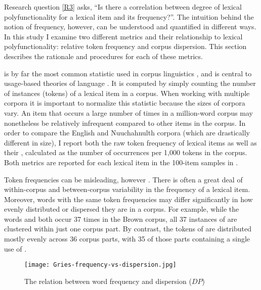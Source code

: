 Research question \ref{R3} asks, \enquote{Is there a correlation between degree of lexical polyfunctionality for a lexical item and its frequency?}. The intuition behind the notion of frequency, however, can be understood and quantified in different ways. In this study I examine two different metrics and their relationship to lexical polyfunctionality: relative token frequency and corpus dispersion. This section describes the rationale and procedures for each of these metrics.

 is by far the most common statistic used in corpus linguistics \parencite[403]{Gries2008}, and is central to usage-based theories of language \parencites{Bybee1985}{Tomasello2003}{Goldberg2006}{Bybee2007}{Bybee2010}{Diessel2019}. It is computed by simply counting the number of instances (tokens) of a lexical item in a corpus. When working with multiple corpora it is important to normalize this statistic because the sizes of corpora vary. An item that occurs a large number of times in a million-word corpus may nonetheless be relatively infrequent compared to other items in the corpus. In order to compare the English and Nuuchahnulth corpora (which are drastically different in size), I report both the raw token frequency of lexical items as well as their , calculated as the number of occurrences per 1,000 tokens in the corpus. Both metrics are reported for each lexical item in the 100-item samples in .

Token frequencies can be misleading, however \parencites{Gries2008}{Gries2021}{Griesfc}. There is often a great deal of within-corpus and between-corpus variability in the frequency of a lexical item. Moreover, words with the same token frequencies may differ significantly in how evenly distributed or dispersed they are in a corpus. For example, while the words  and  both occur 37 times in the Brown corpus, all 37 instances of  are clustered within just one corpus part. By contrast, the tokens of  are distributed mostly evenly across 36 corpus parts, with 35 of those parts containing a single use of  \parencite[100]{Gries2021}.

\begin{figure}
  \texttt{[image: Gries-frequency-vs-dispersion.jpg]}
  \caption[The relation between word frequency and dispersion (DP)]{The relation between word frequency and dispersion ($DP$) }
  \label{fig:Gries-frequency-vs-dispersion}
\end{figure}

